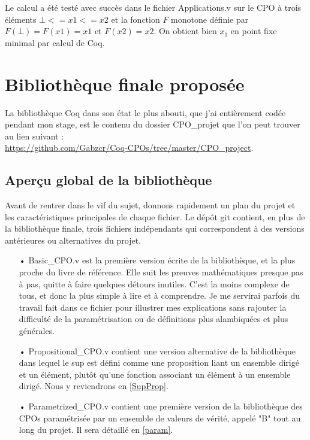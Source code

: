 \documentclass{article}
\newcommand\code[1]{{\fontfamily{lmtt}\selectfont #1}}
\theoremstyle{definition}
\begin{document}
Le calcul a été testé avec succès dans le fichier \code{Applications.v} sur le CPO à trois éléments $\bot <= x1 <= x2$ et la fonction $F$ monotone définie par $F(\bot) = F(x1) = x1$ et $F(x2) = x2$. On obtient bien $x_1$ en point fixe minimal par calcul de Coq.



\section{Bibliothèque finale proposée}

La bibliothèque Coq dans son état le plus abouti, que j'ai entièrement codée pendant mon stage, est le contenu du dossier \code{CPO\_projet} que l'on peut trouver au lien suivant :\\ \href{https://github.com/Gabzcr/Coq-CPOs/tree/master/CPO\_project}{https://github.com/Gabzcr/Coq-CPOs/tree/master/CPO\_project}.

\subsection{Aperçu global de la bibliothèque}

Avant de rentrer dans le vif du sujet, donnons rapidement un plan du projet et les caractéristiques principales de chaque fichier. Le dépôt git contient, en plus de la bibliothèque finale, trois fichiers indépendants qui correspondent à des versions antérieures ou alternatives du projet.

\medskip

\begin{itemize}
\item[•] \code{Basic\_CPO.v} est la première version écrite de la bibliothèque, et la plus proche du livre de référence. Elle suit les preuves mathématiques presque pas à pas, quitte à faire quelques détours inutiles. C'est la moins complexe de tous, et donc la plus simple à lire et à comprendre. Je me servirai parfois du travail fait dans ce fichier pour illustrer mes explications sans rajouter la difficulté de la paramétrisation ou de définitions plus alambiquées et plus générales.
\item[•] \code{Propositional\_CPO.v} contient une version alternative de la bibliothèque dans lequel le sup est défini comme une proposition liant un ensemble dirigé et un élément, plutôt qu'une fonction associant un élément à un ensemble dirigé. Nous y reviendrons en \ref{SupProp}.
\item[•] \code{Parametrized\_CPO.v} contient une première version de la bibliothèque des CPOs paramétrisée par un ensemble de valeurs de vérité, appelé "B" tout au long du projet. Il sera détaillé en \ref{param}.
\end{itemize}
\end{document}
